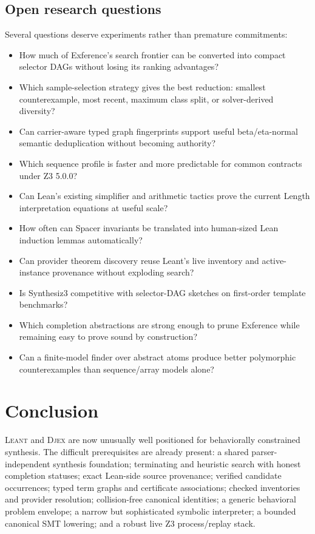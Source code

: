 \documentclass[11pt,oneside]{report}
\newcommand{\Leant}{\textsc{Leant}\xspace}
\newcommand{\Djex}{\textsc{Djex}\xspace}
\begin{document}
\section{Open research questions}

Several questions deserve experiments rather than premature commitments:

\begin{itemize}[leftmargin=2em]
\item How much of Exference's search frontier can be converted into compact selector DAGs without losing its ranking advantages?
\item Which sample-selection strategy gives the best reduction: smallest counterexample, most recent, maximum class split, or solver-derived diversity?
\item Can carrier-aware typed graph fingerprints support useful beta/eta-normal semantic deduplication without becoming authority?
\item Which sequence profile is faster and more predictable for common contracts under Z3 5.0.0?
\item Can Lean's existing simplifier and arithmetic tactics prove the current Length interpretation equations at useful scale?
\item How often can Spacer invariants be translated into human-sized Lean induction lemmas automatically?
\item Can provider theorem discovery reuse Leant's live inventory and active-instance provenance without exploding search?
\item Is Synthesiz3 competitive with selector-DAG sketches on first-order template benchmarks?
\item Which completion abstractions are strong enough to prune Exference while remaining easy to prove sound by construction?
\item Can a finite-model finder over abstract atoms produce better polymorphic counterexamples than sequence/array models alone?
\end{itemize}

\chapter{Conclusion}
\label{chap:conclusion}

\Leant and \Djex are now unusually well positioned for behaviorally constrained synthesis. The difficult prerequisites are already present: a shared parser-independent synthesis foundation; terminating and heuristic search with honest completion statuses; exact Lean-side source provenance; verified candidate occurrences; typed term graphs and certificate associations; checked inventories and provider resolution; collision-free canonical identities; a generic behavioral problem envelope; a narrow but sophisticated symbolic interpreter; a bounded canonical SMT lowering; and a robust live Z3 process/replay stack.
\end{document}
